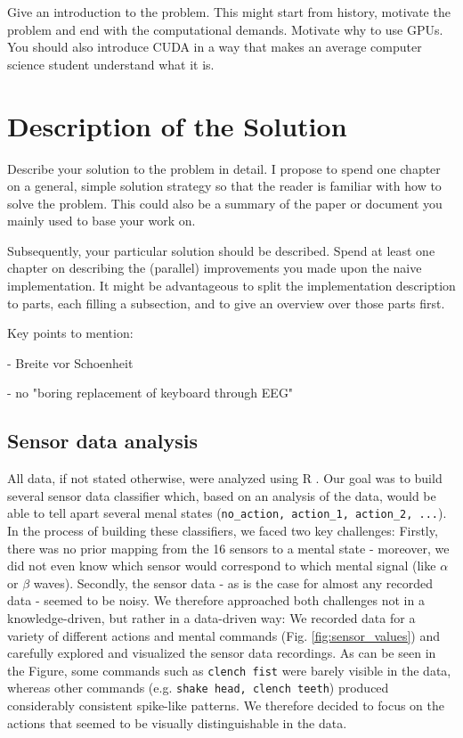\documentclass{utue} %
\begin{document}
Give an introduction to the problem. This might start from history, motivate the problem and end with the computational demands. Motivate why to use GPUs. You should also introduce CUDA in a way that makes an average computer science student understand what it is.

\section{Description of the Solution}

Describe your solution to the problem in detail. I propose to spend one chapter on a general, simple solution strategy so that the reader is familiar with how to solve the problem. This could also be a summary of the paper or document you mainly used to base your work on.

Subsequently, your particular solution should be described. Spend at least one chapter on describing the (parallel) improvements you made upon the naive implementation. It might be advantageous to split the implementation description to parts, each filling a subsection, and to give an overview over those parts first.

Key points to mention:

- Breite vor Schoenheit

- no "boring replacement of keyboard through EEG"



\subsection{Sensor data analysis}
All data, if not stated otherwise, were analyzed using R \cite{RCoreTeam}. Our goal was to build several sensor data classifier which, based on an analysis of the data, would be able to tell apart several menal states (\texttt{no\_action, action\_1, action\_2, ...}). In the process of building these classifiers, we faced two key challenges: Firstly, there was no prior mapping from the 16 sensors to a mental state - moreover, we did not even know which sensor would correspond to which mental signal (like $ \alpha $ or $ \beta $ waves). Secondly, the sensor data - as is the case for almost any recorded data - seemed to be noisy. We therefore approached both challenges not in a knowledge-driven, but rather in a data-driven way: We recorded data for a variety of different actions and mental commands (Fig. \ref{fig:sensor_values}) and carefully explored and visualized the sensor data recordings. As can be seen in the Figure, some commands such as \texttt{clench fist} were barely visible in the data, whereas other commands (e.g. \texttt{shake head, clench teeth}) produced considerably consistent spike-like patterns. We therefore decided to focus on the actions that seemed to be visually distinguishable in the data.
\end{document}
